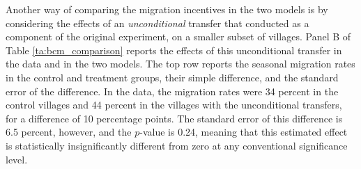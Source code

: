 \documentclass[12pt,pdftex]{article}
\begin{document}

Another way of comparing the migration incentives in the two models is by considering the effects of an \emph{unconditional} transfer that \citet{brch14} conducted as a component of the original experiment, on a smaller subset of villages. Panel B of Table \ref{ta:bcm_comparison} reports the effects of this unconditional transfer in the data and in the two models. The top row reports the seasonal migration rates in the control and treatment groups, their simple difference, and the standard error of the difference. In the data, the migration rates were 34 percent in the control villages and 44 percent in the villages with the unconditional transfers, for a difference of 10  percentage points. The standard error of this difference is 6.5 percent, however, and the $p$-value is 0.24, meaning that this estimated effect is statistically insignificantly different from zero at any conventional significance level.
\end{document}
